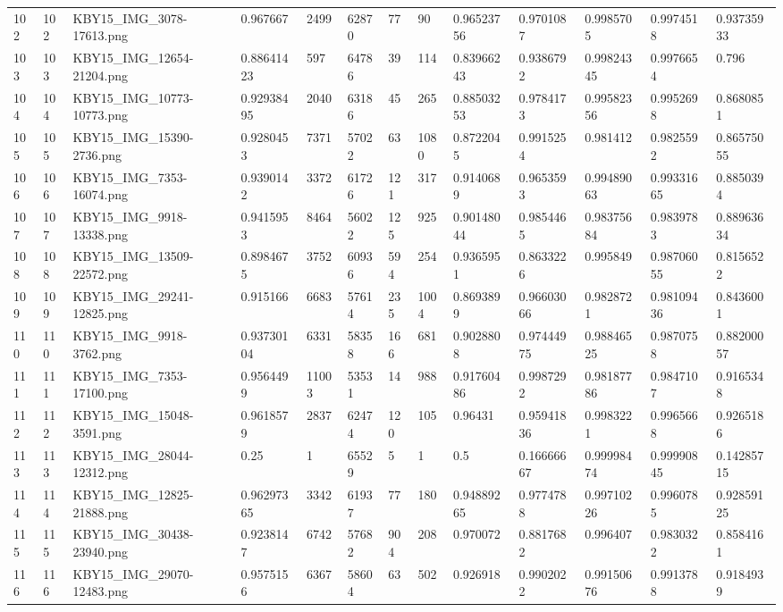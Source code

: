 \documentclass[11pt, a4paper, twoside]{report}
\begin{document}
\begin{longtable}[c]{@{}lllllllllllll@{}}
102 & 102 & KBY15\_IMG\_3078-17613.png & 0.967667 & 2499 & 62870 & 77 & 90 & 0.96523756 & 0.9701087 & 0.9985705 & 0.9974518 & 0.93735933 \\
103 & 103 & KBY15\_IMG\_12654-21204.png & 0.88641423 & 597 & 64786 & 39 & 114 & 0.83966243 & 0.9386792 & 0.99824345 & 0.9976654 & 0.796 \\
104 & 104 & KBY15\_IMG\_10773-10773.png & 0.92938495 & 2040 & 63186 & 45 & 265 & 0.88503253 & 0.9784173 & 0.99582356 & 0.9952698 & 0.8680851 \\
105 & 105 & KBY15\_IMG\_15390-2736.png & 0.9280453 & 7371 & 57022 & 63 & 1080 & 0.8722045 & 0.9915254 & 0.981412 & 0.9825592 & 0.86575055 \\
106 & 106 & KBY15\_IMG\_7353-16074.png & 0.9390142 & 3372 & 61726 & 121 & 317 & 0.9140689 & 0.9653593 & 0.99489063 & 0.99331665 & 0.8850394 \\
107 & 107 & KBY15\_IMG\_9918-13338.png & 0.9415953 & 8464 & 56022 & 125 & 925 & 0.90148044 & 0.9854465 & 0.98375684 & 0.9839783 & 0.88963634 \\
108 & 108 & KBY15\_IMG\_13509-22572.png & 0.8984675 & 3752 & 60936 & 594 & 254 & 0.9365951 & 0.8633226 & 0.995849 & 0.98706055 & 0.8156522 \\
109 & 109 & KBY15\_IMG\_29241-12825.png & 0.915166 & 6683 & 57614 & 235 & 1004 & 0.8693899 & 0.96603066 & 0.9828721 & 0.98109436 & 0.8436001 \\
110 & 110 & KBY15\_IMG\_9918-3762.png & 0.93730104 & 6331 & 58358 & 166 & 681 & 0.9028808 & 0.97444975 & 0.98846525 & 0.9870758 & 0.88200057 \\
111 & 111 & KBY15\_IMG\_7353-17100.png & 0.9564499 & 11003 & 53531 & 14 & 988 & 0.91760486 & 0.9987292 & 0.98187786 & 0.9847107 & 0.9165348 \\
112 & 112 & KBY15\_IMG\_15048-3591.png & 0.9618579 & 2837 & 62474 & 120 & 105 & 0.96431 & 0.95941836 & 0.9983221 & 0.9965668 & 0.9265186 \\
113 & 113 & KBY15\_IMG\_28044-12312.png & 0.25 & 1 & 65529 & 5 & 1 & 0.5 & 0.16666667 & 0.99998474 & 0.99990845 & 0.14285715 \\
114 & 114 & KBY15\_IMG\_12825-21888.png & 0.96297365 & 3342 & 61937 & 77 & 180 & 0.94889265 & 0.9774788 & 0.99710226 & 0.9960785 & 0.92859125 \\
115 & 115 & KBY15\_IMG\_30438-23940.png & 0.9238147 & 6742 & 57682 & 904 & 208 & 0.970072 & 0.8817682 & 0.996407 & 0.9830322 & 0.8584161 \\
116 & 116 & KBY15\_IMG\_29070-12483.png & 0.9575156 & 6367 & 58604 & 63 & 502 & 0.926918 & 0.9902022 & 0.99150676 & 0.9913788 & 0.9184939 \\

\end{longtable}
\end{document}
